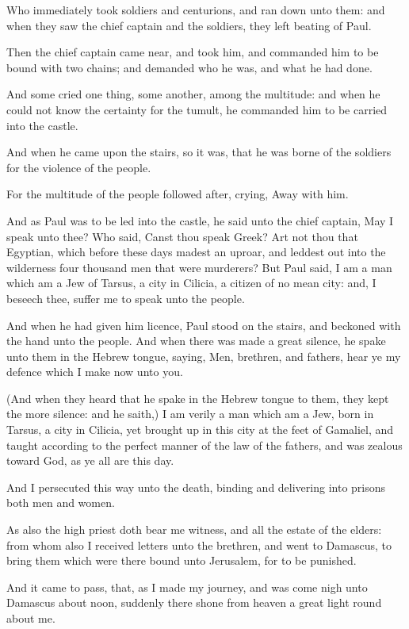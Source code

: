 \Verse Who immediately took soldiers and centurions, and ran down unto them: and when they saw the chief captain and the soldiers, they left beating of Paul.

\Verse Then the chief captain came near, and took him, and commanded him to be bound with two chains; and demanded who he was, and what he had done.

\Verse And some cried one thing, some another, among the multitude: and when he could not know the certainty for the tumult, he commanded him to be carried into the castle.

\Verse And when he came upon the stairs, so it was, that he was borne of the soldiers for the violence of the people.

\Verse For the multitude of the people followed after, crying, Away with him.

\Verse And as Paul was to be led into the castle, he said unto the chief captain, May I speak unto thee? Who said, Canst thou speak Greek?  \Verse Art not thou that Egyptian, which before these days madest an uproar, and leddest out into the wilderness four thousand men that were murderers?  \Verse But Paul said, I am a man which am a Jew of Tarsus, a city in Cilicia, a citizen of no mean city: and, I beseech thee, suffer me to speak unto the people.

\Verse And when he had given him licence, Paul stood on the stairs, and beckoned with the hand unto the people. And when there was made a great silence, he spake unto them in the Hebrew tongue, saying, 
\Chapter
\Verse Men, brethren, and fathers, hear ye my defence which I make now unto you.

\Verse (And when they heard that he spake in the Hebrew tongue to them, they kept the more silence: and he saith,) \Verse I am verily a man which am a Jew, born in Tarsus, a city in Cilicia, yet brought up in this city at the feet of Gamaliel, and taught according to the perfect manner of the law of the fathers, and was zealous toward God, as ye all are this day.

\Verse And I persecuted this way unto the death, binding and delivering into prisons both men and women.

\Verse As also the high priest doth bear me witness, and all the estate of the elders: from whom also I received letters unto the brethren, and went to Damascus, to bring them which were there bound unto Jerusalem, for to be punished.

\Verse And it came to pass, that, as I made my journey, and was come nigh unto Damascus about noon, suddenly there shone from heaven a great light round about me.

